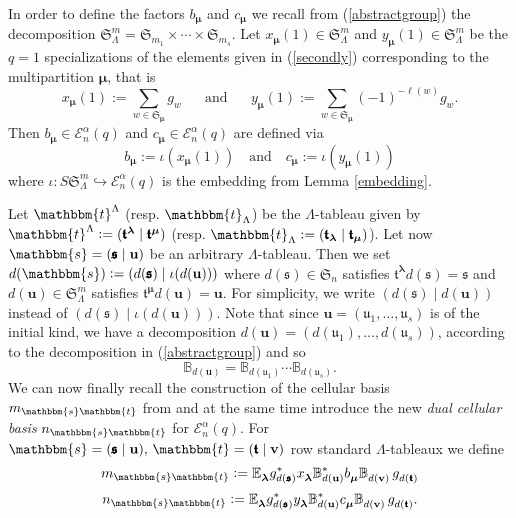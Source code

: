 \documentclass[10pt,a4,twoside,hidelinks,rm]{article}
\newcommand{\BB}{\mathbb{B}}
\newcommand\es{\mathbbm{s}}
\newcommand\et{\mathbbm{t}}
\newcommand\bu{\mathbf{u}}
\newcommand\bv{\mathbf{v}}
\newcommand{\U}{\mathfrak{u}}
\newcommand{\bT}{\pmb{\mathfrak{t}}}
\newcommand{\Bs}{\pmb{\mathfrak{s}}}
\newcommand{\Si}{\mathfrak{S}}
\newcommand{\Ea}{ {\mathcal E}_n^{\alpha}(q)}
\newcommand\blambda{{\boldsymbol\lambda}}
\newcommand\be{\mathbb{E}}
\newcommand\bmu{{\boldsymbol\mu}}
\theoremstyle{plain}
\begin{document}
In order to define the factors $ b_{\bmu} $ and $ c_{\bmu} $ we recall from 
(\ref{abstractgroup}) the decomposition
$\Si^m_{\Lambda}  = \Si_{m_1}  \times \cdots \times \Si_{m_s} $. 
Let $ x_{\bmu}(1) \in \Si^m_{\Lambda}  $ and $ y_{\bmu}(1) \in \Si^m_{\Lambda} $ 
be the $ q= 1 $ specializations of the elements given in (\ref{secondly})
corresponding to the 
multipartition $\bmu$, that is
\begin{equation}\label{secondly} x_{\bmu}(1) :=  \sum_{w\in\Si_{\bmu}}g_{w} 
\, \, \, \, \, \, \, \, 
\mbox{   and     }
\, \, \, \, \, \, \, \, 
y_{\bmu}(1) :=  \sum_{w\in\Si_{\bmu}}(-1)^{-\ell(w)}g_{w}.
\end{equation}
Then $   b_{\bmu} \in \Ea$ and $   c_{\bmu} \in \Ea $ are defined via 
\begin{equation}
  b_{\bmu}:=\iota(x_{\bmu}(1)) \, \, \, \, \mbox{  and     } \, \, \, \,
  c_{\bmu}:=\iota(y_{\bmu}(1))
\end{equation}
where $ \iota:S\Si^m_{\Lambda} \hookrightarrow \Ea $ is the embedding from Lemma \ref{embedding}.

\medskip
Let $ \et^{\Lambda} $ (resp. $ \et_{\Lambda} $) be the $ \Lambda$-tableau given 
by $  \et^{\Lambda} :=(\bT^{\blambda} \mid \bT^{\bmu}) $
(resp. $  \et_{\Lambda} :=(\bT_{\blambda} \mid \bT_{\bmu}) $). 
Let now $ \es =(\Bs \mid  \bu) $ be an arbitrary 
$\Lambda$-tableau. 
Then 
we set $ d(\es) := (d({\Bs}) \mid \iota(d(\bu))) $ 
where $ d(\Bs) \in \Si_n $ satisfies 
$ \bT^{ \blambda } d(\Bs) =  \Bs $ and $ d(\bu) \in \Si^m_{\Lambda}$
satisfies $ \bT^{ \bmu} d(\bu) = \bu $. For simplicity, we write $(d({\Bs}) \! \!\mid d(\bu)) $
instead of $ (d({\Bs}) \mid \iota(d(\bu))) $.
Note that since
$\bu=(\U_1, \ldots,\U_s)$ is of the initial kind, we have a decomposition
$ d(\bu) = (d(\U_1),  \ldots, d(\U_s)) $, according to the decomposition in 
(\ref{abstractgroup}) and so 
\begin{equation}
  \BB_{d(\bu)}=  \BB_{d(\U_1)}\cdots \BB_{d(\U_s)}.
\end{equation}  
{\color{black}We can now finally recall the construction of the cellular basis $ m_{\es\et}$ from \cite{ER} and
at the same time introduce the new {\it dual cellular basis} $ n_{\es\et} $ for $ \Ea $.}
For $\es=(\Bs \mid \bu),\, \et=(\bT \mid \bv) $ row standard $\Lambda$-tableaux we define
\begin{equation}{\label{maindefM}}
m_{\es\et}:=   { \be}^{}_{\blambda} g_{d(\Bs)}^{\ast}  x^{}_{\blambda}
\BB_{d(\bu)}^{\ast}   b^{}_{\bmu}\BB^{}_{d(\bv)}  \,
g^{}_{d(\bT)}
\end{equation}
\begin{equation}{\label{maindefN}}
n_{\es\et}:=  { \be}^{}_{\blambda} g_{d(\Bs)}^{\ast}  y^{}_{\blambda}
\BB_{d(\bu)}^{\ast}  c^{}_{\bmu}\BB^{}_{d(\bv)}  \,
g^{}_{d(\bT)}.
\end{equation}
\end{document}

